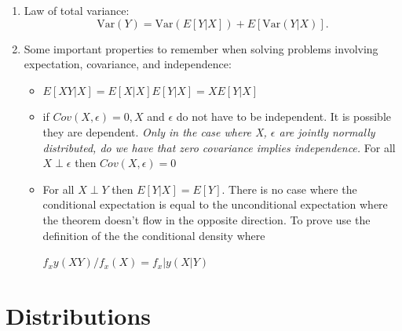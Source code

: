 \documentclass{article}
\begin{document}
\begin{enumerate}
    \item Law of total variance: 
    \[
    \text{Var}(Y) = \text{Var}(E[Y|X]) + E[\text{Var}(Y|X)].
    \]
    \item Some important properties to remember when solving problems involving expectation, covariance, and independence:
\begin{itemize}
    \item  $E[XY|X] = E[X|X]E[Y|X] = XE[Y|X]$
     \item if $Cov(X, \epsilon) = 0, X$ and $\epsilon$ do not have to be independent. It is possible they are dependent. \textit{Only in the case where X, $\epsilon$ are jointly normally distributed, do we have that zero covariance implies independence.} For all $X \perp \epsilon$ then $Cov(X, \epsilon) = 0$
     \item For all $X \perp Y$ then $E[Y|X] = E[Y]$. There is no case where the conditional expectation is equal to the unconditional expectation where the theorem doesn't flow in the opposite direction. To prove use the definition of the the conditional density where 
     \vspace{-1mm}
     \begin{center}
              $f_xy(XY)/f_x(X) = f_x|y(X|Y)$
     \end{center}
\end{itemize}
\end{enumerate}

\section{Distributions}
\end{document}
